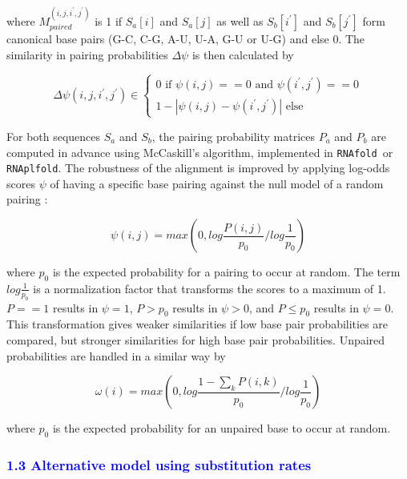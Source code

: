 \documentclass{bmcart}
\begin{document}
\noindent where $M_{paired}^{(i,j,i^\prime,j^\prime)}$ is 1 if $S_a[i]$ and $S_a[j]$ as
well as $S_b[i^\prime]$ and $S_b[j^\prime]$ form canonical base pairs (G-C, C-G,
A-U, U-A, G-U or U-G) and else 0. The similarity in pairing probabilities
$\Delta \psi$ is then calculated by

\begin{equation}\label{eq9}
	\Delta \psi(i,j,i^\prime,j^\prime) \in \left\{ \begin{array}{l}
			0 \textrm{ if }\psi(i,j) == 0 
			  \textrm{ and }\psi(i^\prime,j^\prime) == 0 \\
		1 - | \psi(i,j) - \psi(i^\prime,j^\prime) | \textrm{ else}
		\end{array}\right.
\end{equation}

\noindent For both sequences $S_a$ and $S_b$, the pairing probability matrices $P_a$ and
$P_b$ are computed in advance using McCaskill's algorithm, implemented in
\texttt{RNAfold }or \texttt{RNAplfold}. The robustness of the alignment is improved by applying
log-odds scores $\psi$ of having a specific base pairing against the null model
of a random pairing \cite{Will17432929}:

\begin{equation}\label{eq11}
	\psi(i,j) = max \left( 0, log \frac{P(i,j)}{p_0} / log \frac{1}{p_0} \right)
\end{equation}

\noindent where $p_0$ is the expected probability for a pairing to occur at random. The
term $log \frac{1}{p_0}$ is a normalization factor that transforms the scores to
a maximum of 1. $P==1$ results in $\psi=1$, $P>p_0$ results in $\psi>0$, and $P\le
p_0$ results in $\psi=0$.  This transformation gives weaker similarities if low
base pair probabilities are compared, but stronger similarities for high base pair
probabilities. Unpaired probabilities are handled in a similar way by

\begin{equation}\label{eq12}
	\omega(i) = max \left( 0, log \frac{1 - \sum_k P(i,k)}{p_0} / log \frac{1}{p_0} \right)
\end{equation}

\noindent  where $p_0$ is the expected probability for an unpaired base to occur at
random.

\textcolor{blue}{
\subsubsection*{1.3 Alternative model using substitution rates}
}
\end{document}
